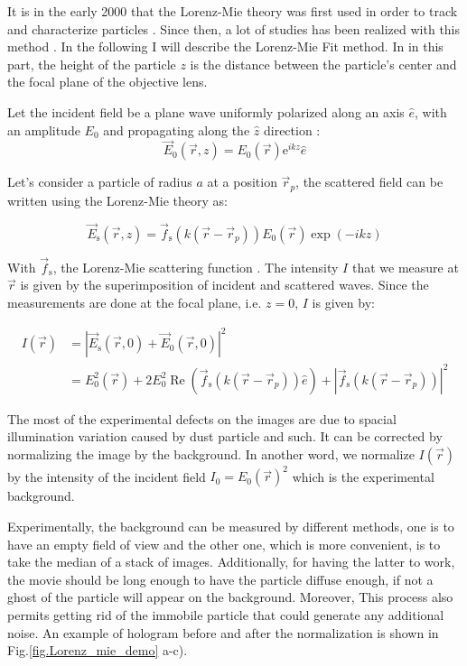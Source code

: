 It is in the early 2000 that the Lorenz-Mie theory was first used in order to track and characterize particles \cite{ovryn_imaging_2000, lee_characterizing_2007}. Since then, a lot of studies has been realized with this method \cite{katz_applications_2010}. In the following I will describe the Lorenz-Mie Fit method. In in this part, the height of the particle $z$ is the distance between the particle's center and the focal plane of the objective lens.

Let the incident field be a plane wave uniformly polarized along an axis $ \hat{e}$, with an amplitude $E_0$ and propagating along the $\hat{z}$ direction :
\begin{equation}
	\vec{E}_0(\vec{r},z) = E_0(\vec{r}) \mathrm{e}^{ikz}\hat{e}
\end{equation}

Let's consider a particle of radius $a$ at a position $\vec{r}_p $, the scattered field can be written using the Lorenz-Mie theory \cite{f_bohren_absorption_1998} as:

\begin{equation}
	\vec{E}_\mathrm{s}(\vec{r}, z) =  \vec{f}_\mathrm{s}(k(\vec{r} - \vec{r}_p))E_0(\vec{r}) \exp \left(-ikz\right) 
\end{equation} 

With $\vec{f}_\mathrm{s}$, the Lorenz-Mie scattering function \cite{f_bohren_absorption_1998}. The intensity $I$ that we measure at $\vec{r}$ is given by the superimposition of incident and scattered waves. Since the measurements are done at the focal plane, i.e. $z = 0 $, $I$ is given by:

\begin{equation}
	\begin{aligned}
	I(\vec{r}) & = |\vec{E}_\mathrm{s}(\vec{r}, 0) + \vec{E}_0(\vec{r}, 0)|^2 \\
	& = E_0^2(\vec{r}) + 2 E_0^2\operatorname{Re} \left(\vec{f}_\mathrm{s}(k(\vec{r}- \vec{r}_p)) \hat{e}\right) + | \vec{f}_\mathrm{s}(k(\vec{r}- \vec{r}_p)) |^2
	\end{aligned}
\end{equation}

The most of the experimental defects on the images are due to spacial illumination variation caused by dust particle and such. It can be corrected by normalizing the image by the background. In another word, we normalize  $I(\vec{r})$ by the intensity of the incident field $I_0 = E_0(\vec{r})^2$ which is the experimental background. 

Experimentally, the background can be measured by different methods, one is to have an empty field of view and the other one, which is more convenient, is to take the median of a stack of images. Additionally, for having the latter to work, the movie should be long enough to have the particle diffuse enough, if not a ghost of the particle will appear on the background. Moreover, This process also permits getting rid of the immobile particle that could generate any additional noise. An example of hologram before and after the normalization is shown in Fig.\ref{fig.Lorenz_mie_demo} a-c).

